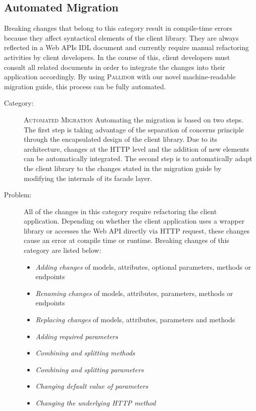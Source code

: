 \subsection{Automated Migration}\label{subsec:EvalAutomated}
Breaking changes that belong to this category result in compile-time errors because they affect syntactical elements of the client library. They are always reflected in a Web APIs IDL document and currently require manual refactoring activities by client developers. In the course of this, client developers must consult all related documents in order to integrate the changes into their application accordingly. By using \textsc{Pallidor} with our novel machine-readable migration guide, this process can be fully automated.
\newpage
\begin{description}
	\item[Category:] \textsc{Automated Migration} \newline Automating the migration is based on two steps. The first step is taking advantage of the separation of concerns principle through the encapsulated design of the client library. Due to its architecture, changes at the HTTP level and the addition of new elements can be automatically integrated. The second step is to automatically adapt the client library to the changes stated in the migration guide by modifying the internals of its facade layer. 
	\item[Problem:] All of the changes in this category require refactoring the client application. Depending on whether the client application uses a wrapper library or accesses the Web API directly via HTTP request, these changes cause an error at compile time or runtime. Breaking changes of this category are listed below:
	\begin{itemize}
				\item \textit{Adding changes} of models, attributes, optional parameters, methods or endpoints
		\item \textit{Renaming changes} of models, attributes, parameters, methods or endpoints
		\item \textit{Replacing changes} of models, attributes, parameters and methods 
		\item \textit{Adding required parameters}
		\item \textit{Combining and splitting methods} 
		\item \textit{Combining and splitting parameters}
		\item \textit{Changing default value of parameters}
		\item \textit{Changing the underlying HTTP method}

\end{itemize}
\end{description}
